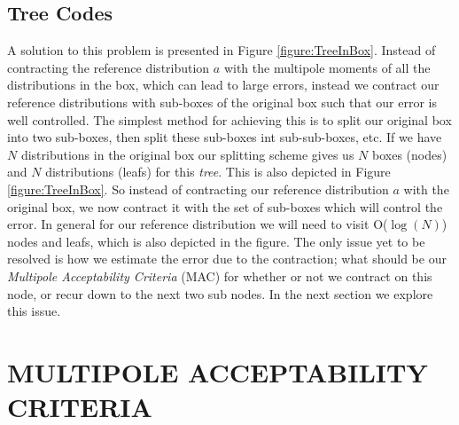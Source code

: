 \documentclass[prb,aps,nobibnotes,superbib,preprint]{revtex4}
\begin{document}
\subsection{Tree Codes}

A solution to this problem is presented in Figure {\ref{figure:TreeInBox}}. 
Instead of contracting the reference distribution $a$ with the multipole moments of all the distributions in the
box, which can lead to large errors, instead we contract our reference distributions with sub-boxes of the original
box such that our error is well controlled. The simplest method for achieving this is to split our original box
into two sub-boxes, then split these sub-boxes int sub-sub-boxes, etc. If we have $N$ distributions in the original 
box our splitting scheme gives us $N$ boxes (nodes) and $N$ distributions (leafs) for this {\it tree}. This is also
depicted in  Figure {\ref{figure:TreeInBox}}. So instead of contracting our reference distribution $a$ with the 
original box, we now contract it with the set of sub-boxes which will control the error. In general for our reference
distribution we will need to visit {\cal O}($\log (N)$) nodes and leafs, which is also depicted in the figure. The 
only issue yet to be resolved is how we estimate the error due to the contraction; what should be our
{\it Multipole Acceptability Criteria} (MAC) for whether or not we contract on this node, or recur down to the next two 
sub nodes. In the next section we explore this issue.


\section{MULTIPOLE ACCEPTABILITY CRITERIA } 
\end{document}
